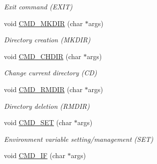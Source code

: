 \begin{DoxyCompactItemize}
\begin{DoxyCompactList}\small\item\em Exit command (E\-X\-I\-T) \end{DoxyCompactList}\item 
\hypertarget{classDOS__Shell_a585866333c2d3953164701b55c6e981b}{void \hyperlink{classDOS__Shell_a585866333c2d3953164701b55c6e981b}{C\-M\-D\-\_\-\-M\-K\-D\-I\-R} (char $\ast$args)}\label{classDOS__Shell_a585866333c2d3953164701b55c6e981b}

\begin{DoxyCompactList}\small\item\em Directory creation (M\-K\-D\-I\-R) \end{DoxyCompactList}\item 
\hypertarget{classDOS__Shell_a6edb8644f0d513d8704f3b6570d0530c}{void \hyperlink{classDOS__Shell_a6edb8644f0d513d8704f3b6570d0530c}{C\-M\-D\-\_\-\-C\-H\-D\-I\-R} (char $\ast$args)}\label{classDOS__Shell_a6edb8644f0d513d8704f3b6570d0530c}

\begin{DoxyCompactList}\small\item\em Change current directory (C\-D) \end{DoxyCompactList}\item 
\hypertarget{classDOS__Shell_a99cdab0015b968a2363091b073db69ea}{void \hyperlink{classDOS__Shell_a99cdab0015b968a2363091b073db69ea}{C\-M\-D\-\_\-\-R\-M\-D\-I\-R} (char $\ast$args)}\label{classDOS__Shell_a99cdab0015b968a2363091b073db69ea}

\begin{DoxyCompactList}\small\item\em Directory deletion (R\-M\-D\-I\-R) \end{DoxyCompactList}\item 
\hypertarget{classDOS__Shell_a5d80bed57ef834ce2b5069ca28491d1d}{void \hyperlink{classDOS__Shell_a5d80bed57ef834ce2b5069ca28491d1d}{C\-M\-D\-\_\-\-S\-E\-T} (char $\ast$args)}\label{classDOS__Shell_a5d80bed57ef834ce2b5069ca28491d1d}

\begin{DoxyCompactList}\small\item\em Environment variable setting/management (S\-E\-T) \end{DoxyCompactList}\item 
\hypertarget{classDOS__Shell_a9c7b48b6688fc5aeb0badb2833c5c476}{void \hyperlink{classDOS__Shell_a9c7b48b6688fc5aeb0badb2833c5c476}{C\-M\-D\-\_\-\-I\-F} (char $\ast$args)}\label{classDOS__Shell_a9c7b48b6688fc5aeb0badb2833c5c476}


\end{DoxyCompactItemize}
